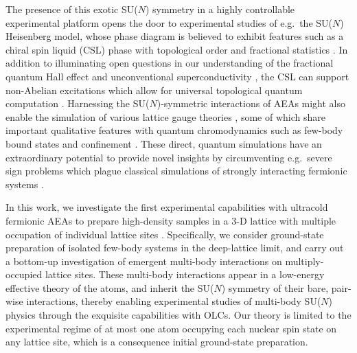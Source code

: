 \documentclass[preprint,showkeys,nofootinbib]{revtex4-1}
\newcommand{\1}{\mathds{1}}
\begin{document}
The presence of this exotic SU($N$) symmetry in a highly controllable
experimental platform opens the door to experimental studies of
e.g.~the SU($N$) Heisenberg model, whose phase diagram is believed to
exhibit features such as a chiral spin liquid (CSL) phase with
topological order and fractional statistics \cite{hermele2009mott,
  hermele2011topological, chen2016syntheticgaugefield}.  In addition
to illuminating open questions in our understanding of the fractional
quantum Hall effect and unconventional superconductivity
\cite{lee2006doping, lee2008high, gong2014emergent}, the CSL can
support non-Abelian excitations which allow for universal topological
quantum computation \cite{freedman2004class, hermele2011topological}.
Harnessing the SU($N$)-symmetric interactions of AEAs might also
enable the simulation of various lattice gauge theories
\cite{wieseu.-j.2013ultracold, zohar2016quantum}, some of which share
important qualitative features with quantum chromodynamics such as
few-body bound states and confinement \cite{banerjee2013atomic,
  rico2018nuclear}.  These direct, quantum simulations have an
extraordinary potential to provide novel insights by circumventing
e.g.~severe sign problems which plague classical simulations of
strongly interacting fermionic systems \cite{wieseu.-j.2013ultracold,
  wu2003exact}.

In this work, we investigate the first experimental capabilities with
ultracold fermionic AEAs to prepare high-density samples in a 3-D
lattice with multiple occupation of individual lattice sites
\cite{goban2018emergence}.  Specifically, we consider ground-state
preparation of isolated few-body systems in the deep-lattice limit,
and carry out a bottom-up investigation of emergent multi-body
interactions on multiply-occupied lattice sites.  These multi-body
interactions appear in a low-energy effective theory of the atoms, and
inherit the SU($N$) symmetry of their bare, pair-wise interactions,
thereby enabling experimental studies of multi-body SU($N$) physics
through the exquisite capabilities with OLCs.  Our theory is limited
to the experimental regime of at most one atom occupying each nuclear
spin state on any lattice site, which is a consequence initial
ground-state preparation.
\end{document}
